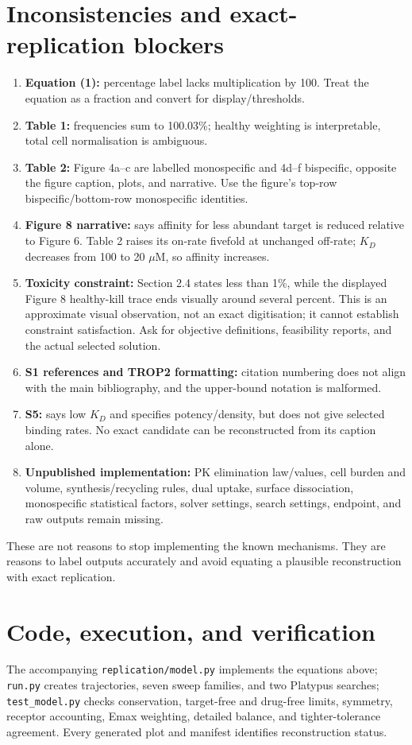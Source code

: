 \documentclass[11pt,a4paper]{article}
\begin{document}
\section{Inconsistencies and exact-replication blockers}
\begin{enumerate}
\item \textbf{Equation (1):} percentage label lacks multiplication by 100. Treat the equation as a fraction and convert for display/thresholds.
\item \textbf{Table 1:} frequencies sum to 100.03\%; healthy weighting is interpretable, total cell normalisation is ambiguous.
\item \textbf{Table 2:} Figure 4a--c are labelled monospecific and 4d--f bispecific, opposite the figure caption, plots, and narrative. Use the figure's top-row bispecific/bottom-row monospecific identities.
\item \textbf{Figure 8 narrative:} says affinity for less abundant target is reduced relative to Figure 6. Table 2 raises its on-rate fivefold at unchanged off-rate; $K_D$ decreases from 100 to 20 $\mu$M, so affinity increases.
\item \textbf{Toxicity constraint:} Section 2.4 states less than 1\%, while the displayed Figure 8 healthy-kill trace ends visually around several percent. This is an approximate visual observation, not an exact digitisation; it cannot establish constraint satisfaction. Ask for objective definitions, feasibility reports, and the actual selected solution.
\item \textbf{S1 references and TROP2 formatting:} citation numbering does not align with the main bibliography, and the upper-bound notation is malformed.
\item \textbf{S5:} says low $K_D$ and specifies potency/density, but does not give selected binding rates. No exact candidate can be reconstructed from its caption alone.
\item \textbf{Unpublished implementation:} PK elimination law/values, cell burden and volume, synthesis/recycling rules, dual uptake, surface dissociation, monospecific statistical factors, solver settings, search settings, endpoint, and raw outputs remain missing.
\end{enumerate}
These are not reasons to stop implementing the known mechanisms. They are reasons to label outputs accurately and avoid equating a plausible reconstruction with exact replication.

\section{Code, execution, and verification}
The accompanying \texttt{replication/model.py} implements the equations above; \texttt{run.py} creates trajectories, seven sweep families, and two Platypus searches; \texttt{test\_model.py} checks conservation, target-free and drug-free limits, symmetry, receptor accounting, Emax weighting, detailed balance, and tighter-tolerance agreement. Every generated plot and manifest identifies reconstruction status.
\end{document}
